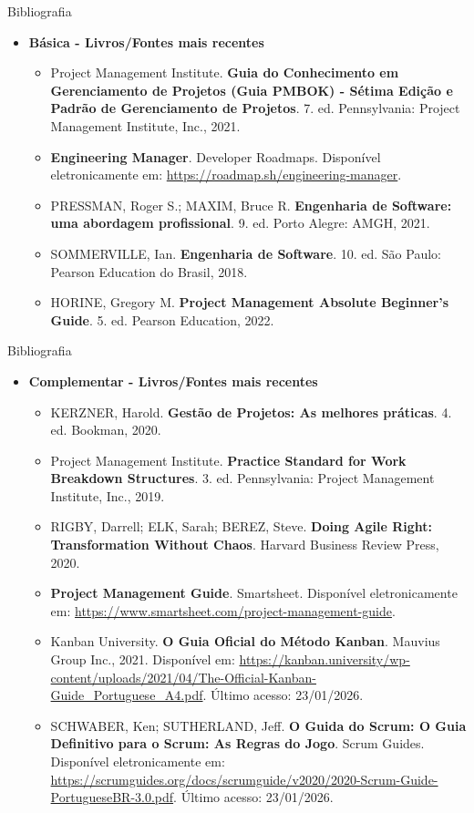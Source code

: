 \documentclass{beamer}
\begin{document}
\begin{frame}{Bibliografia}
    \begin{itemize}
        \item \textbf{Básica - Livros/Fontes mais recentes}
        \begin{itemize}
            \justifying
            \scriptsize
            \item Project Management Institute. \textbf{Guia do Conhecimento em Gerenciamento de Projetos (Guia PMBOK) - Sétima Edição e Padrão de Gerenciamento de Projetos}. 7. ed. Pennsylvania: Project Management Institute, Inc., 2021.
            \item \textbf{Engineering Manager}. Developer Roadmaps. Disponível eletronicamente em: \url{https://roadmap.sh/engineering-manager}.
            \item PRESSMAN, Roger S.; MAXIM, Bruce R. \textbf{Engenharia de Software: uma abordagem profissional}. 9. ed. Porto Alegre: AMGH, 2021.
            \item SOMMERVILLE, Ian. \textbf{Engenharia de Software}. 10. ed. São Paulo: Pearson Education do Brasil, 2018.
            \item HORINE, Gregory M. \textbf{Project Management Absolute Beginner's Guide}. 5. ed. Pearson Education, 2022.
        \end{itemize}
    \end{itemize}
\end{frame}

\begin{frame}{Bibliografia}
	\begin{itemize}
		\item \textbf{Complementar - Livros/Fontes mais recentes}
		\begin{itemize}
			\justifying
			\scriptsize
			\item KERZNER, Harold. \textbf{Gestão de Projetos: As melhores práticas}. 4. ed. Bookman, 2020.
			\item Project Management Institute. \textbf{Practice Standard for Work Breakdown Structures}. 3. ed. Pennsylvania: Project Management Institute, Inc., 2019.
			\item RIGBY, Darrell; ELK, Sarah; BEREZ, Steve. \textbf{Doing Agile Right: Transformation Without Chaos}. Harvard Business Review Press, 2020.
			\item \textbf{Project Management Guide}. Smartsheet. Disponível eletronicamente em: \url{https://www.smartsheet.com/project-management-guide}.
			\item Kanban University. \textbf{O Guia Oficial do Método Kanban}. Mauvius Group Inc., 2021. Disponível em: \url{https://kanban.university/wp-content/uploads/2021/04/The-Official-Kanban-Guide_Portuguese_A4.pdf}. Último acesso: 23/01/2026.
			\item SCHWABER, Ken; SUTHERLAND, Jeff. \textbf{O Guida do Scrum: O Guia Definitivo para o Scrum: As Regras do Jogo}. Scrum Guides. Disponível eletronicamente em: \url{https://scrumguides.org/docs/scrumguide/v2020/2020-Scrum-Guide-PortugueseBR-3.0.pdf}. Último acesso: 23/01/2026.
		\end{itemize}
	\end{itemize}
\end{frame}
\end{document}
